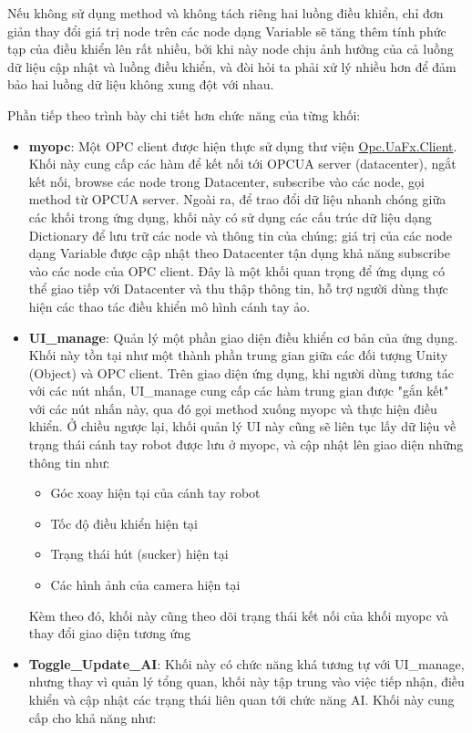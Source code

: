 Nếu không sử dụng method và không tách riêng hai luồng điều khiển, chỉ đơn giản thay đổi giá trị node trên các node dạng Variable sẽ tăng thêm tính phức tạp của điều khiển lên rất nhiều, bởi khi này node chịu ảnh hưởng của cả luồng dữ liệu cập nhật và luồng điều khiển, và đòi hỏi ta phải xử lý nhiều hơn để đảm bảo hai luồng dữ liệu không xung đột với nhau.

Phần tiếp theo trình bày chi tiết hơn chức năng của từng khối:

\begin{itemize}
    \item \textbf{myopc}: Một OPC client được hiện thực sử dụng thư viện \href{https://www.nuget.org/packages/Opc.UaFx.Client/#readme-body-tab}{Opc.UaFx.Client}. Khối này cung cấp các hàm để kết nối tới OPCUA server (datacenter), ngắt kết nối, browse các node trong Datacenter, subscribe vào các node, gọi method từ OPCUA server. Ngoài ra, để trao đổi dữ liệu nhanh chóng giữa các khối trong ứng dụng, khối này có sử dụng các cấu trúc dữ liệu dạng Dictionary để lưu trữ các node và thông tin của chúng; giá trị của các node dạng Variable được cập nhật theo Datacenter tận dụng khả năng subscribe vào các node của OPC client. Đây là một khối quan trọng để ứng dụng có thể giao tiếp với Datacenter và thu thập thông tin, hỗ trợ người dùng thực hiện các thao tác điều khiển mô hình cánh tay ảo. 
    \item \textbf{UI\_manage}: Quản lý một phần giao diện điều khiển cơ bản của ứng dụng. Khối này tồn tại như một thành phần trung gian giữa các đối tượng Unity (Object) và OPC client. Trên giao diện ứng dụng, khi người dùng tương tác với các nút nhấn, UI\_manage cung cấp các hàm trung gian được "gắn kết" với các nút nhấn này, qua đó gọi method xuống myopc và thực hiện điều khiển. Ở chiều ngược lại, khối quản lý UI này cũng sẽ liên tục lấy dữ liệu về trạng thái cánh tay robot được lưu ở myopc, và cập nhật lên giao diện những thông tin như:
    \begin{itemize}
        \item Góc xoay hiện tại của cánh tay robot
        \item Tốc độ điều khiển hiện tại
        \item Trạng thái hút (sucker) hiện tại
        \item Các hình ảnh của camera hiện tại
    \end{itemize}
    Kèm theo đó, khối này cũng theo dõi trạng thái kết nối của khối myopc và thay đổi giao diện tương ứng
    \item \textbf{Toggle\_Update\_AI}: Khối này có chức năng khá tương tự với UI\_manage, nhưng thay vì quản lý tổng quan, khối này tập trung vào việc tiếp nhận, điều khiển và cập nhật các trạng thái liên quan tới chức năng AI. Khối này cung cấp cho khả năng như:

\end{itemize}
